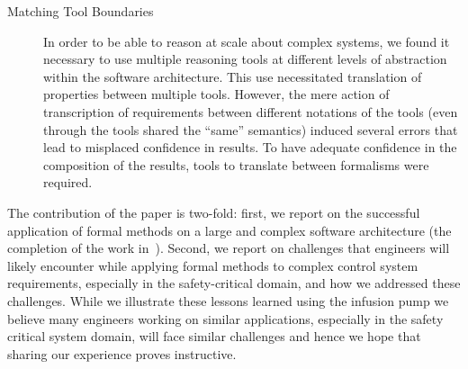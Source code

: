 \begin{description}
        
        
    \item[Matching Tool Boundaries] In order to be able to reason at scale about complex systems, we found it necessary to use multiple reasoning tools at different levels of abstraction within the software architecture. This use necessitated translation of properties between multiple tools. However, the mere action of transcription of requirements between different notations of the tools (even through the tools shared the “same” semantics) induced several errors that lead to misplaced confidence in results. To have adequate confidence in the composition of the results, tools to translate between formalisms were required. %
        
\end{description}

The contribution of the paper is two-fold: first, we report on the successful application of formal methods on a large and complex software architecture (the completion of the work in~\cite{hilt2013}). Second, we report on challenges that engineers will likely encounter while applying formal methods to complex control system requirements, especially in the safety-critical domain, and how we addressed these challenges. %
While we illustrate these lessons learned using the infusion pump we believe many engineers working on similar applications, especially in the safety critical system domain, will face similar challenges and hence we hope that sharing our experience proves instructive. %

